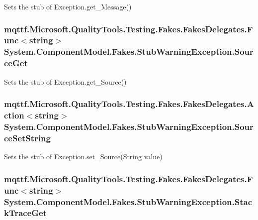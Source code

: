 Sets the stub of Exception.\-get\-\_\-\-Message()

\hypertarget{class_system_1_1_component_model_1_1_fakes_1_1_stub_warning_exception_a0e0c69dee761e1da9a38d1bcfda49fce}{
\subsubsection[{Source\-Get}]{\setlength{\rightskip}{0pt plus 5cm}mqttf.\-Microsoft.\-Quality\-Tools.\-Testing.\-Fakes.\-Fakes\-Delegates.\-Func$<$string$>$ System.\-Component\-Model.\-Fakes.\-Stub\-Warning\-Exception.\-Source\-Get}}\label{class_system_1_1_component_model_1_1_fakes_1_1_stub_warning_exception_a0e0c69dee761e1da9a38d1bcfda49fce}


Sets the stub of Exception.\-get\-\_\-\-Source()

\hypertarget{class_system_1_1_component_model_1_1_fakes_1_1_stub_warning_exception_abcd6821f09d3b4d893e5eb48caa9573c}{
\subsubsection[{Source\-Set\-String}]{\setlength{\rightskip}{0pt plus 5cm}mqttf.\-Microsoft.\-Quality\-Tools.\-Testing.\-Fakes.\-Fakes\-Delegates.\-Action$<$string$>$ System.\-Component\-Model.\-Fakes.\-Stub\-Warning\-Exception.\-Source\-Set\-String}}\label{class_system_1_1_component_model_1_1_fakes_1_1_stub_warning_exception_abcd6821f09d3b4d893e5eb48caa9573c}


Sets the stub of Exception.\-set\-\_\-\-Source(\-String value)

\hypertarget{class_system_1_1_component_model_1_1_fakes_1_1_stub_warning_exception_a1309ad327f9edec43f7f8b79524c7732}{
\subsubsection[{Stack\-Trace\-Get}]{\setlength{\rightskip}{0pt plus 5cm}mqttf.\-Microsoft.\-Quality\-Tools.\-Testing.\-Fakes.\-Fakes\-Delegates.\-Func$<$string$>$ System.\-Component\-Model.\-Fakes.\-Stub\-Warning\-Exception.\-Stack\-Trace\-Get}}\label{class_system_1_1_component_model_1_1_fakes_1_1_stub_warning_exception_a1309ad327f9edec43f7f8b79524c7732}


